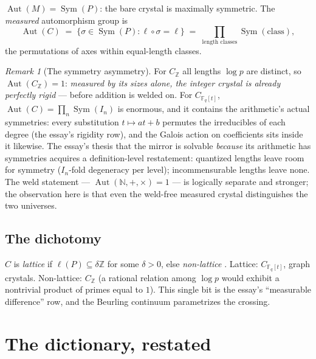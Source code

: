 \documentclass[11pt]{article}
\theoremstyle{remark}
\newtheorem{remark}{Remark}
\newcommand{\N}{\mathbb{N}}
\newcommand{\Z}{\mathbb{Z}}
\newcommand{\F}{\mathbb{F}}
\newcommand{\Aut}{\operatorname{Aut}}
\newcommand{\Sym}{\operatorname{Sym}}
\begin{document}
$\Aut(M) = \Sym(P)$: the bare crystal is maximally symmetric. The \emph{measured} automorphism
group is
\[
\Aut(C) \;=\; \{\sigma \in \Sym(P) : \ell \circ \sigma = \ell\}
\;=\; \prod_{\text{length classes}} \Sym(\text{class}),
\]
the permutations of axes within equal-length classes.

\begin{remark}[The symmetry asymmetry]\label{rem:sym}
For $C_{\Z}$ all lengths $\log p$ are distinct, so $\Aut(C_{\Z}) = 1$: \emph{measured by its sizes
alone, the integer crystal is already perfectly rigid} --- before addition is welded on. For
$C_{\F_q[t]}$, $\Aut(C) = \prod_n \Sym(I_n)$ is enormous, and it contains the arithmetic's actual
symmetries: every substitution $t \mapsto at + b$ permutes the irreducibles of each degree (the
essay's rigidity row), and the Galois action on coefficients sits inside it likewise. The essay's
thesis that the mirror is solvable \emph{because} its arithmetic has symmetries acquires a
definition-level restatement: quantized lengths leave room for symmetry ($I_n$-fold degeneracy per
level); incommensurable lengths leave none. The weld statement --- $\Aut(\N, +, \times) = 1$ ---
is logically separate and stronger; the observation here is that even the weld-free measured
crystal distinguishes the two universes.
\end{remark}

\subsection{The dichotomy}

$C$ is \emph{lattice} if $\ell(P) \subseteq \delta\Z$ for some $\delta > 0$, else
\emph{non-lattice} \cite{LapidusBook}. Lattice: $C_{\F_q[t]}$, graph crystals. Non-lattice:
$C_{\Z}$ (a rational relation among $\log p$ would exhibit a nontrivial product of primes equal to
$1$). This single bit is the essay's ``measurable difference'' row, and the Beurling continuum
parametrizes the crossing.

\section{The dictionary, restated}
\end{document}
